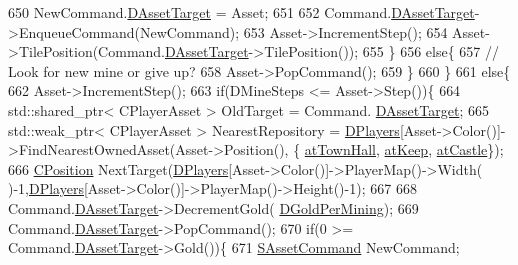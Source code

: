 \begin{DoxyCode}
650                         NewCommand.\hyperlink{structSAssetCommand_a3d9b43f6e59c386c48c41a65448a0c39}{DAssetTarget} = Asset;
651                         
652                         Command.\hyperlink{structSAssetCommand_a3d9b43f6e59c386c48c41a65448a0c39}{DAssetTarget}->EnqueueCommand(NewCommand);
653                         Asset->IncrementStep();
654                         Asset->TilePosition(Command.\hyperlink{structSAssetCommand_a3d9b43f6e59c386c48c41a65448a0c39}{DAssetTarget}->TilePosition());
655                     \}
656                     \textcolor{keywordflow}{else}\{
657                         \textcolor{comment}{// Look for new mine or give up?   }
658                         Asset->PopCommand();
659                     \}
660                 \}
661                 \textcolor{keywordflow}{else}\{
662                     Asset->IncrementStep();
663                     \textcolor{keywordflow}{if}(DMineSteps <= Asset->Step())\{
664                         std::shared\_ptr< CPlayerAsset > OldTarget = Command.
      \hyperlink{structSAssetCommand_a3d9b43f6e59c386c48c41a65448a0c39}{DAssetTarget};
665                         std::weak\_ptr< CPlayerAsset > NearestRepository = 
      \hyperlink{classCGameModel_a524436c3560b10e1c6d6fdd0b66565dc}{DPlayers}[Asset->Color()]->FindNearestOwnedAsset(Asset->Position(), \{
      \hyperlink{GameDataTypes_8h_a5600d4fc433b83300308921974477feca5c0fa8a0f367f3358365536d3c7aa321}{atTownHall}, \hyperlink{GameDataTypes_8h_a5600d4fc433b83300308921974477fecaaed39451bedb0392ad95fbc9c95bef31}{atKeep}, \hyperlink{GameDataTypes_8h_a5600d4fc433b83300308921974477feca6727b47855e74f3f7b6e4a96d0c2a42a}{atCastle}\});
666                         \hyperlink{classCPosition}{CPosition} NextTarget(\hyperlink{classCGameModel_a524436c3560b10e1c6d6fdd0b66565dc}{DPlayers}[Asset->Color()]->PlayerMap()->Width(
      )-1,\hyperlink{classCGameModel_a524436c3560b10e1c6d6fdd0b66565dc}{DPlayers}[Asset->Color()]->PlayerMap()->Height()-1);
667                         
668                         Command.\hyperlink{structSAssetCommand_a3d9b43f6e59c386c48c41a65448a0c39}{DAssetTarget}->DecrementGold(
      \hyperlink{classCGameModel_a886529fe17365373d28c2881fdaa21f0}{DGoldPerMining});
669                         Command.\hyperlink{structSAssetCommand_a3d9b43f6e59c386c48c41a65448a0c39}{DAssetTarget}->PopCommand();
670                         \textcolor{keywordflow}{if}(0 >= Command.\hyperlink{structSAssetCommand_a3d9b43f6e59c386c48c41a65448a0c39}{DAssetTarget}->Gold())\{
671                             \hyperlink{structSAssetCommand}{SAssetCommand} NewCommand;

\end{DoxyCode}
